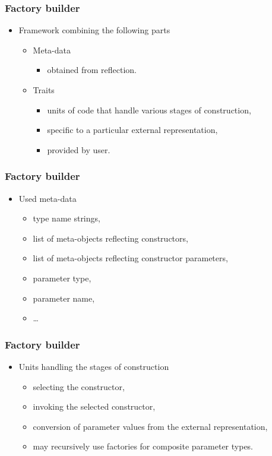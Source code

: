 \documentclass[compress,table,xcolor=table]{beamer}
\begin{document}
\begin{frame}
  \frametitle{Factory builder}
    \Huge
  \begin{itemize}
    \item{Framework combining the following parts}
    \begin{itemize}
      \LARGE
    \item Meta-data
          \begin{itemize}
          \Large
        \item obtained from reflection.
          \end{itemize}
    \item Traits
          \begin{itemize}
          \Large
        \item units of code that handle various stages of construction,
        \item specific to a particular external representation,
        \item provided by user.
        \end{itemize}
      \end{itemize}
  \end{itemize}
\end{frame}
\begin{frame}
  \frametitle{Factory builder}
  \Huge
    \begin{itemize}
    \item{Used meta-data}
          \begin{itemize}
        \Large
        \item type name strings,
        \item list of meta-objects reflecting constructors,
        \item list of meta-objects reflecting constructor parameters,
        \item parameter type,
        \item parameter name,
        \item \ldots
          \end{itemize}
    \end{itemize}
\end{frame}
\begin{frame}
  \frametitle{Factory builder}
  \Huge
  \begin{itemize}
    \item{Units handling the stages of construction}
          \begin{itemize}
        \Large
        \item selecting the  constructor,
        \item invoking the selected constructor,
        \item conversion of parameter values from the external representation,
        \item may recursively use factories for composite parameter types.
        \end{itemize}
  \end{itemize}
\end{frame}
\end{document}
